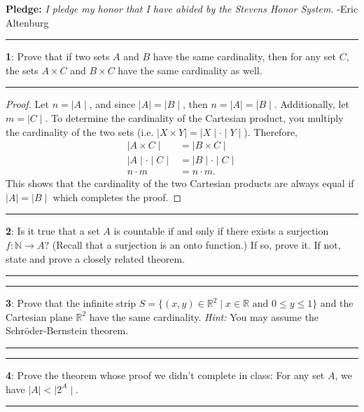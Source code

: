 \documentclass[11pt]{article}
\newcommand\question[2]{\vspace{.25in}\hrule\textbf{#1}: #2\vspace{.5em}\hrule\vspace{.10in}}
\newcommand{\R}{\mathbb{R}}
\newcommand{\N}{\mathbb{N}}
\begin{document}
\raggedright
\newcommand\NAME{Eric Altenburg}  %
\newcommand\COURSE{MA-240}
\newcommand\HWNUM{7}              %


\textbf{Pledge:} \textit{I pledge my honor that I have abided by the Stevens Honor System.} -Eric Altenburg

\question{1}{Prove that if two sets $A$ and $B$ have the same cardinality, then for any set $C$, the sets $A \times C$ and $B \times C$ have the same cardinality as well.}

\begin{proof}
	Let $n = \mid A \mid$, and since $\mid A \mid = \mid B \mid$, then $n = \mid A \mid = \mid B \mid$. Additionally, let $m = \mid C \mid$. To determine the cardinality of the Cartesian product, you multiply the cardinality of the two sets (i.e. $\mid X \times Y \mid = \mid X \mid \cdot \mid Y \mid$). Therefore, 
	\begin{align*}
		\mid A \times C \mid &= \mid B \times C \mid\\
		\mid A \mid \cdot \mid C \mid &= \mid B \mid \cdot \mid C \mid\\
		n \cdot m &= n \cdot m.
	\end{align*}
	This shows that the cardinality of the two Cartesian products are always equal if $\mid A \mid = \mid B \mid$ which completes the proof.
\end{proof}

\question{2}{Is it true that a set $A$ is countable if and only if there exists a surjection $f : \N \rightarrow A$? (Recall that a surjection is an onto function.) If so, prove it. If not, state and prove a closely related theorem.}

\question{3}{Prove that the infinite strip $S = \{(x,y) \in \R^2 \mid x \in \R \text{ and } 0 \le y \le 1 \}$ and the Cartesian plane $\R^2$ have the same cardinality. \textit{Hint:} You may assume the Schröder-Bernstein theorem.}

\question{4}{Prove the theorem whose proof we didn't complete in class: For any set $A$, we have $\mid A \mid < \mid 2^A \mid$.}



	
\end{document}
